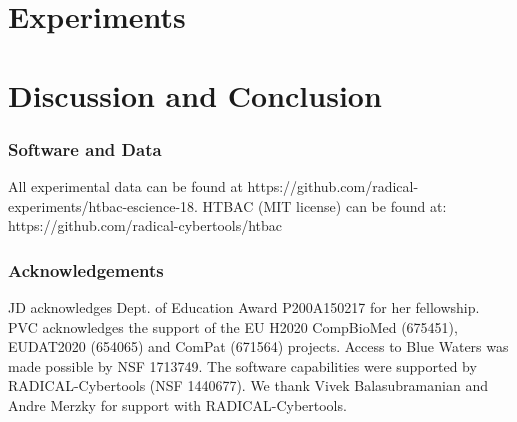 \documentclass[conference]{IEEEtran}
\begin{document}
\section{Experiments}\label{sec:experiments}


\section{Discussion and Conclusion}\label{sec:discussion}


\subsubsection*{Software and Data}

{\footnotesize All experimental data can be found at 
https://github.com/radical-experiments/htbac-escience-18. HTBAC (MIT license) 
can be found at: https://github.com/radical-cybertools/htbac}

\subsubsection*{Acknowledgements}
%

{\footnotesize JD acknowledges Dept. of Education Award P200A150217 for her
fellowship. PVC acknowledges the support of the EU H2020 CompBioMed (675451),
EUDAT2020 (654065) and ComPat (671564) projects. Access to Blue Waters was
made possible by NSF 1713749. The software capabilities were supported by
RADICAL-Cybertools (NSF 1440677). We thank Vivek Balasubramanian and Andre
Merzky for support with RADICAL-Cybertools.}

\newpage



\end{document}
